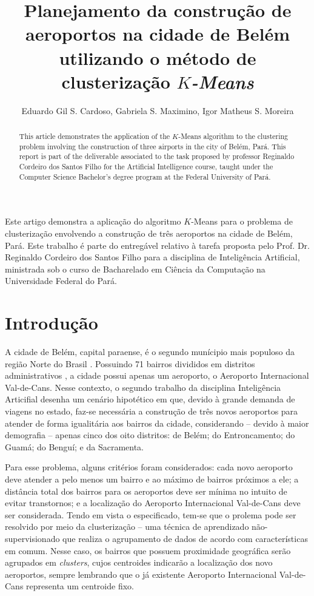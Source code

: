\documentclass[12pt]{article}
\title{Planejamento da construção de aeroportos na cidade de Belém utilizando o método de clusterização \textit{$K$-Means}}
\author{Eduardo Gil S. Cardoso\inst{1}, Gabriela S. Maximino\inst{1}, Igor Matheus S. Moreira\inst{1}}
\begin{document}
\maketitle

\begin{abstract}
  This article demonstrates the application of the $K$-Means algorithm to the clustering problem involving the construction of three airports in the city of Belém, Pará. This report is part of the deliverable associated to the task proposed by professor Reginaldo Cordeiro dos Santos Filho for the Artificial Intelligence course, taught under the Computer Science Bachelor's degree program at the Federal University of Pará.
\end{abstract}
     
\begin{resumo} 
  Este artigo demonstra a aplicação do algoritmo $K$-Means para o problema de clusterização envolvendo a construção de três aeroportos na cidade de Belém, Pará. Este trabalho é parte do entregável relativo à tarefa proposta pelo Prof. Dr. Reginaldo Cordeiro dos Santos Filho para a disciplina de Inteligência Artificial, ministrada sob o curso de Bacharelado em Ciência da Computação na Universidade Federal do Pará.
\end{resumo}



\section{Introdução} %



A cidade de Belém, capital paraense, é o segundo munícipio mais populoso da região Norte do Brasil \cite{ibge}. Possuindo 71 bairros divididos em distritos administrativos \cite{belemwiki}, a cidade possui apenas um aeroporto, o Aeroporto Internacional Val-de-Cans. Nesse contexto, o segundo trabalho da disciplina Inteligência Articifial desenha um cenário hipotético em que, devido à grande demanda de viagens no estado, faz-se necessária a construção de três novos aeroportos para atender de forma igualitária aos bairros da cidade, considerando -- devido à maior demografia -- apenas cinco dos oito distritos: de Belém; do Entroncamento; do Guamá; do Benguí; e da Sacramenta.

Para esse problema, alguns critérios foram considerados: cada novo aeroporto deve atender a pelo menos um bairro e ao máximo de bairros próximos a ele; a distância total dos bairros para os aeroportos deve ser mínima no intuito de evitar transtornos; e a localização do Aeroporto Internacional Val-de-Cans deve ser considerada. Tendo em vista o especificado, tem-se que o prolema pode ser resolvido por meio da clusterização -- uma técnica de aprendizado não-supervisionado que realiza o agrupamento de dados de acordo com características em comum. Nesse caso, os bairros que possuem proximidade geográfica serão agrupados em \textit{clusters}, cujos centroides indicarão a localização dos novo aeroportos, sempre lembrando que o já existente Aeroporto Internacional Val-de-Cans representa um centroide fixo.
\end{document}
